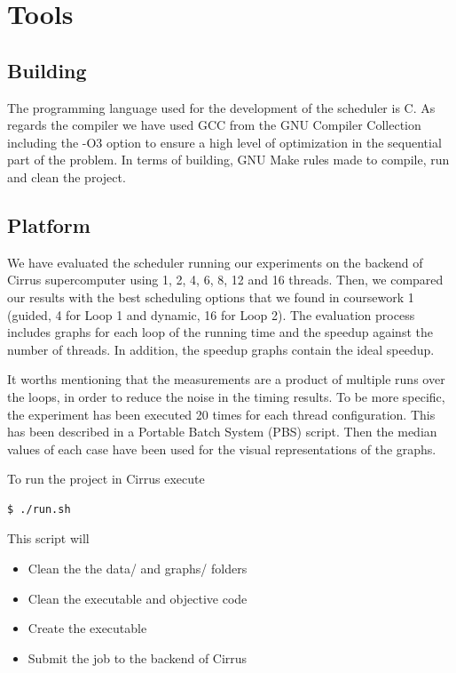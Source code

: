 \documentclass[12pt,a4paper]{article}
\begin{document}
\clearpage

\section{Tools}

\subsection{Building}
The programming language used for the development of the scheduler is C. As regards the compiler we have used GCC from the GNU Compiler Collection including the -O3 option to ensure a high level of optimization in the sequential part of the problem. In terms of building, GNU Make rules made to compile, run and clean the project.

\subsection{Platform}
We have evaluated the scheduler running our experiments on the backend of Cirrus supercomputer using 1, 2, 4, 6, 8, 12 and 16 threads. Then, we compared our results with the best scheduling options that we found in coursework 1 (guided, 4 for Loop 1 and dynamic, 16 for Loop 2). The evaluation process includes graphs for each loop of the running time and the speedup against the number of threads. In addition, the speedup graphs contain the ideal speedup.

It worths mentioning that the measurements are a product of multiple runs over the loops, in order to reduce the noise in the timing results. To be more specific, the experiment has been executed 20 times for each thread configuration. This has been described in a Portable Batch System (PBS) script. Then the median values of each case have been used for the visual representations of the graphs.

To run the project in Cirrus execute
\begin{lstlisting}[language=bash]
  $ ./run.sh
\end{lstlisting}

This script will
\begin{itemize}
  \item Clean the the data/ and graphs/ folders
  \item Clean the executable and objective code
  \item Create the executable
  \item Submit the job to the backend of Cirrus
\end{itemize}
\end{document}
